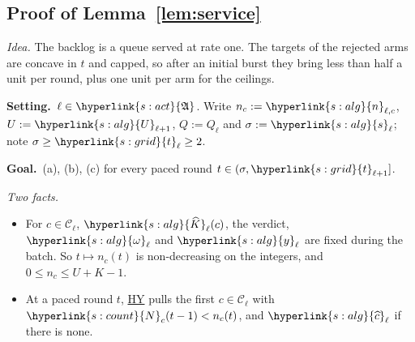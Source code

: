 \documentclass[10pt]{article}
\newcommand{\sy}[2]{{\hyperlink{#1}{#2}}}
\newcommand{\1}{\mathbf{1}}
\newcommand{\Ng}{\sy{s:count}{N}}
\newcommand{\tl}{\sy{s:grid}{t}}
\newcommand{\HY}{\hyperref[def:hy]{\textup{HY}}}
\newcommand{\yg}{\sy{s:alg}{y}}
\newcommand{\Ug}{\sy{s:alg}{U}}
\newcommand{\sA}{\sy{s:alg}{s}}
\newcommand{\Ld}{\sy{s:alg}{\widehat c}}
\newcommand{\Kh}{\sy{s:alg}{\widehat K}}
\newcommand{\nt}{\sy{s:alg}{n}}
\newcommand{\om}{\sy{s:alg}{\omega}}
\newcommand{\Act}{\sy{s:act}{\mathfrak A}}
\newcommand{\Setting}{\noindent\textbf{Setting.}\ }
\newcommand{\Goal}{\par\smallskip\noindent\textbf{Goal.}\ }
\begin{document}
\subsection{Proof of Lemma~\ref{lem:service}}\label{sec:pf-lem:service}
\noindent\emph{Idea.} The backlog is a queue served at rate one. The targets of the rejected arms are concave in $t$ and capped, so after an initial burst they bring less
than half a unit per round, plus one unit per arm for the ceilings.

\begin{setgoal}
\Setting $\ell\in\Act$. Write $n_c:=\nt_{\ell,c}$, $U:=\Ug_{\ell+1}$, $Q:=Q_\ell$ and $\sigma:=\sA_\ell$; note $\sigma\ge\tl_\ell\ge2$.
\Goal (a), (b), (c) for every paced round $t\in(\sigma,\tl_{\ell+1}]$.
\end{setgoal}

\noindent\emph{Two facts.}
\begin{itemize}
\item[(Q1)] For $c\in\mathcal C_\ell$, $\Kh_\ell(c)$, the verdict, $\om_\ell$ and $\yg_\ell$ are fixed during the batch. So $t\mapsto n_c(t)$ is non-decreasing on the integers,
and $0\le n_c\le U+K-1$.
\item[(Q2)] At a paced round $t$, \HY{} pulls the first $c\in\mathcal C_\ell$ with $\Ng_c(t-1)<n_c(t)$, and $\Ld_\ell$ if there is none.
\end{itemize}
\end{document}
